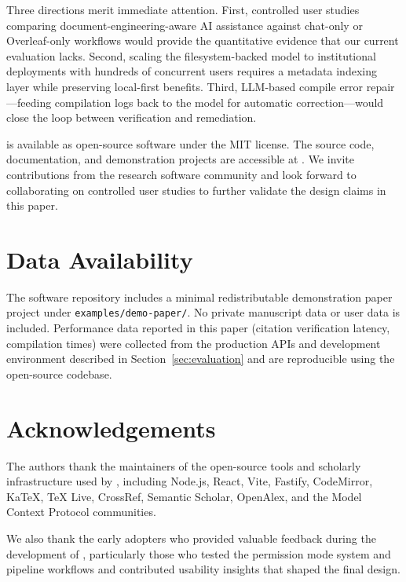 Three directions merit immediate attention. First, controlled user studies
comparing document-engineering-aware AI assistance against chat-only or
Overleaf-only workflows would provide the quantitative evidence that our
current evaluation lacks. Second, scaling the filesystem-backed model to
institutional deployments with hundreds of concurrent users requires a metadata
indexing layer while preserving local-first benefits. Third, LLM-based compile
error repair---feeding compilation logs back to the model for automatic
correction---would close the loop between verification and remediation.

\software{} is available as open-source software under the MIT license.
The source code, documentation, and demonstration projects are accessible at
\repo{}. We invite contributions from the research software community and look
forward to collaborating on controlled user studies to further validate the
design claims in this paper.

\section*{Data Availability}

The software repository includes a minimal redistributable demonstration paper
project under \texttt{examples/demo-paper/}. No private manuscript data or user
data is included. Performance data reported in this paper (citation
verification latency, compilation times) were collected from the production
APIs and development environment described in Section~\ref{sec:evaluation} and
are reproducible using the open-source codebase.

\section*{Acknowledgements}

The authors thank the maintainers of the open-source tools and scholarly
infrastructure used by \software{}, including Node.js, React, Vite, Fastify,
CodeMirror, KaTeX, \TeX{} Live, CrossRef, Semantic Scholar, OpenAlex,
and the Model Context Protocol communities.

We also thank the early adopters who provided valuable feedback during the
development of \software{}, particularly those who tested the permission mode
system and pipeline workflows and contributed usability insights that shaped
the final design.

